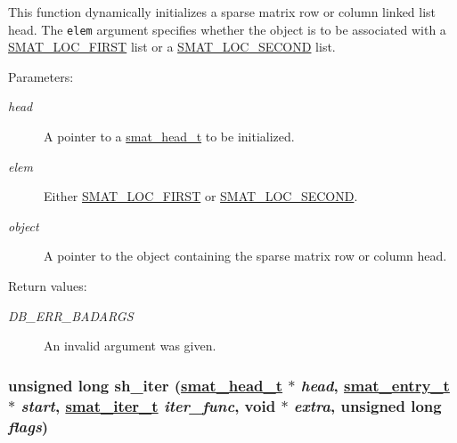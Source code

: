 This function dynamically initializes a sparse matrix row or column linked list head. The {\tt elem} argument specifies whether the object is to be associated with a \hyperlink{group__dbprim__smat_a47a135}{SMAT\_\-LOC\_\-FIRST} list or a \hyperlink{group__dbprim__smat_a47a136}{SMAT\_\-LOC\_\-SECOND} list.\begin{Desc}
\item[Parameters: ]\par
\begin{description}
\item[{\em 
head}]A pointer to a \hyperlink{group__dbprim__smat_a1}{smat\_\-head\_\-t} to be initialized. \item[{\em 
elem}]Either \hyperlink{group__dbprim__smat_a47a135}{SMAT\_\-LOC\_\-FIRST} or \hyperlink{group__dbprim__smat_a47a136}{SMAT\_\-LOC\_\-SECOND}. \item[{\em 
object}]A pointer to the object containing the sparse matrix row or column head.\end{description}
\end{Desc}
\begin{Desc}
\item[Return values: ]\par
\begin{description}
\item[{\em 
DB\_\-ERR\_\-BADARGS}]An invalid argument was given. \end{description}
\end{Desc}
\hypertarget{group__dbprim__smat_a20}{
\subsubsection[sh\_\-iter]{\setlength{\rightskip}{0pt plus 5cm}unsigned long sh\_\-iter (\hyperlink{group__dbprim__smat_a1}{smat\_\-head\_\-t} $\ast$ {\em head}, \hyperlink{group__dbprim__smat_a2}{smat\_\-entry\_\-t} $\ast$ {\em start}, \hyperlink{group__dbprim__smat_a4}{smat\_\-iter\_\-t} {\em iter\_\-func}, void $\ast$ {\em extra}, unsigned long {\em flags})}}
\label{group__dbprim__smat_a20}



